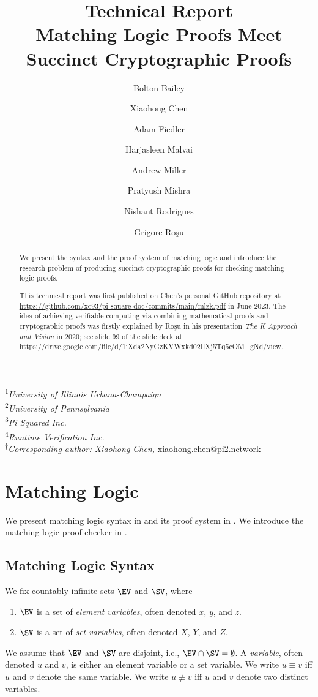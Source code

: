 \documentclass{article}
\title{{\Large Technical Report}\\
  Matching Logic Proofs Meet Succinct Cryptographic Proofs}
\author{Bolton Bailey\af{\afuiuc,\afpisqrd}
   \and Xiaohong Chen\af{\afuiuc,\afpisqrd,\afrv,$\dag$} 
    \and Adam Fiedler\af{\afpisqrd,\afrv} 
    \and Harjasleen Malvai\af{\afuiuc} 
    \and Andrew Miller\af{\afuiuc} 
    \and Pratyush Mishra\af{\afupen} 
    \and Nishant Rodrigues\af{\afuiuc,\afpisqrd,\afrv} 
    \and Grigore Ro{\c{s}}u\af{\afuiuc,\afpisqrd,\afrv}
}
\date{}
\newcommand{\afuiuc}{1}
\newcommand{\afupen}{2}
\newcommand{\afpisqrd}{3}
\newcommand{\afrv}{4}
\begin{document}
\maketitle

\vspace{-2\baselineskip}
\begin{center}
\textsuperscript{\afuiuc}\textit{University of Illinois Urbana-Champaign}\\
\textsuperscript{\afupen}\textit{University of Pennsylvania}\\
\textsuperscript{\afpisqrd}\textit{Pi Squared Inc.}\\
\textsuperscript{\afrv}\textit{Runtime Verification Inc.}\\
\textsuperscript{$\dag$}\textit{Corresponding author: Xiaohong Chen, }\url{xiaohong.chen@pi2.network}
\end{center}

\begin{abstract}
We present the syntax and the proof system of matching logic
and introduce the research problem of producing 
succinct cryptographic proofs for checking matching logic proofs. 

This technical report was first published on Chen's personal
GitHub  repository at 
\url{https://github.com/xc93/pi-square-doc/commits/main/mlzk.pdf}
in June 2023. 
The idea of achieving verifiable computing 
via combining mathematical proofs and cryptographic proofs
was firstly explained by Ro\c{s}u in his presentation
\textit{The K Approach and Vision} in 2020;
see slide 99 of the slide deck at
\url{https://drive.google.com/file/d/1iXda2NyGzKVWxkd02IlXj5Tq5cOM_gNd/view}. 
\end{abstract}

\section{Matching Logic}

We present matching logic syntax in 
and its proof system in .
We introduce the matching logic proof checker in .

\subsection{Matching Logic Syntax}
\label{sec:ml_syntax}

We fix countably infinite sets $\EV$ and $\SV$, where
\begin{enumerate}
\item $\EV$ is a set of \emph{element variables},
      often denoted $x$, $y$, and $z$.
\item $\SV$ is a set of \emph{set variables},
      often denoted $X$, $Y$, and $Z$.
\end{enumerate}
We assume that $\EV$ and $\SV$ are disjoint, i.e., $\EV \cap \SV = \emptyset$.
A \emph{variable}, often denoted $u$ and $v$,
is either an element variable or a set variable.
We write $u \equiv v$ iff $u$ and $v$ denote the same variable.
We write $u \not\equiv v$ iff $u$ and $v$ denote two distinct variables.
\end{document}
